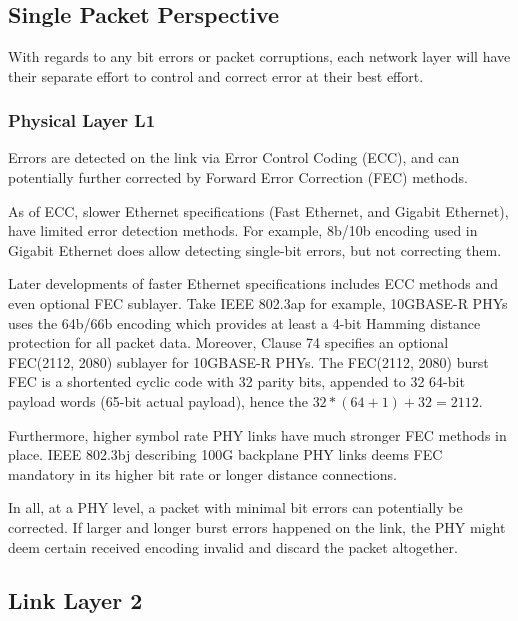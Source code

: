\documentclass[12pt,letterpaper]{article}
\begin{document}
\section{}

\subsection{Single Packet Perspective}

With regards to any bit errors or packet corruptions, each network layer will have their separate effort to control and correct error at their best effort.

\subsubsection{Physical Layer L1}

Errors are detected on the link via Error Control Coding (ECC), and can potentially further corrected by Forward Error Correction (FEC) methods. 

As of ECC, slower Ethernet specifications (Fast Ethernet, and Gigabit Ethernet), have limited error detection methods. For example, 8b/10b encoding used in Gigabit Ethernet does allow detecting single-bit errors, but not correcting them. 

Later developments of faster Ethernet specifications includes ECC methods and even optional FEC sublayer. Take IEEE 802.3ap for example, 10GBASE-R PHYs uses the 64b/66b encoding which provides at least a 4-bit Hamming distance protection for all packet data. Moreover, Clause 74 specifies an optional FEC(2112, 2080) sublayer for 10GBASE-R PHYs. The FEC(2112, 2080) burst FEC is a shortented cyclic code with 32 parity bits, appended to 32 64-bit payload words (65-bit actual payload), hence the $32*(64 + 1) + 32 = 2112$.

Furthermore, higher symbol rate PHY links have much stronger FEC methods in place. IEEE 802.3bj describing 100G backplane PHY links deems FEC mandatory in its higher bit rate or longer distance connections.

In all, at a PHY level, a packet with minimal bit errors can potentially be corrected. If larger and longer burst errors happened on the link, the PHY might deem certain received encoding invalid and discard the packet altogether.

\subsection{Link Layer 2}
\end{document}
